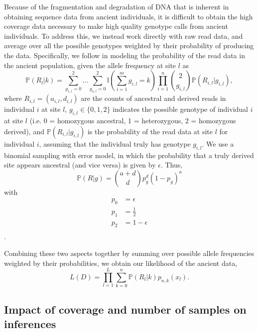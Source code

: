 \documentclass[11pt, oneside]{article}   	%
\begin{document}
Because of the fragmentation and degradation of DNA that is inherent in obtaining sequence data from ancient individuals, it is difficult to obtain the high coverage data necessary to make high quality genotype calls from ancient individuals. To address this, we instead work directly with raw read data, and average over all the possible genotypes weighted by their probability of producing the data. Specifically, we follow \citet{nielsen2012snp} in modeling the probability of the read data in the ancient population, given the allele frequency at site $l$ as
\[
\mathbb{P}(R_l | k) = \sum_{g_{1,l} = 0}^2 \ldots \sum_{g_{n,l} = 0}^2 \mathbb{I}\left(\sum_{i=1}^m g_{i,l} = k\right) \prod_{i=1}^n \binom{2}{g_{i,l}}\mathbb{P}(R_{i,l} | g_{i,l}),
\]
where $R_{i,l}= (a_{i,l}, d_{i,l})$ are the counts of ancestral and derived reads in individual $i$ at site $l$, $g_{i,l} \in \{0, 1, 2\}$ indicates the possible genotype of individual $i$ at site $l$ (i.e. 0 = homozygous ancestral, 1 = heterozygous, 2 = homozygous derived), and $\mathbb{P}(R_{i,l} | g_{i,l})$ is the probability of the read data at site $l$ for individual $i$, assuming that the individual truly has genotype $g_{i,l}$. We use a binomial sampling with error model, in which the probability that a truly derived site appears ancestral (and vice versa) is given by $\epsilon$. Thus,
\[
\mathbb{P}(R | g) = \binom{a + d}{d} p_{g}^d(1-p_{g})^a
\]
with
\begin{align*}
p_0 &= \epsilon\\
p_1 &= \frac{1}{2}\\
p_2 &= 1-\epsilon\\
\end{align*}.

Combining these two aspects together by summing over possible allele frequencies weighted by their probabilities, we obtain our likelihood of the ancient data,
\begin{equation}
L(D) = \prod_{l=1}^L \sum_{k = 0}^n \mathbb{P}(R_l | k) p_{n,k}(x_l).
\label{likelihood}
\end{equation}

\subsection{Impact of coverage and number of samples on inferences}
\end{document}
